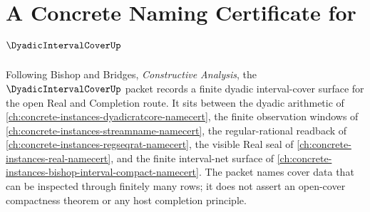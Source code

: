 \chapter{A Concrete Naming Certificate for $\DyadicIntervalCoverUp$}
\label{ch:concrete-instances-dyadic-interval-cover-namecert}

Following Bishop and Bridges, \emph{Constructive Analysis}, the $\DyadicIntervalCoverUp$ packet records a finite dyadic interval-cover surface for the open Real and Completion route. It sits between the dyadic arithmetic of \autoref{ch:concrete-instances-dyadicratcore-namecert}, the finite observation windows of \autoref{ch:concrete-instances-streamname-namecert}, the regular-rational readback of \autoref{ch:concrete-instances-regseqrat-namecert}, the visible Real seal of \autoref{ch:concrete-instances-real-namecert}, and the finite interval-net surface of \autoref{ch:concrete-instances-bishop-interval-compact-namecert}. The packet names cover data that can be inspected through finitely many rows; it does not assert an open-cover compactness theorem or any host completion principle.

